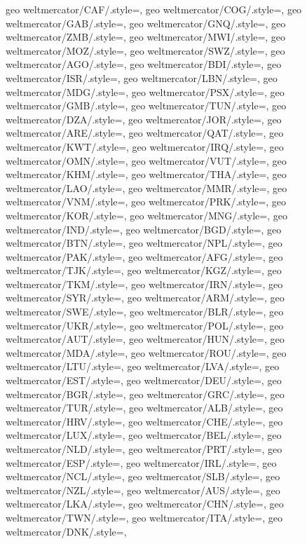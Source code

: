 {  geo weltmercator/CAF/.style={},
  geo weltmercator/COG/.style={},
  geo weltmercator/GAB/.style={},
  geo weltmercator/GNQ/.style={},
  geo weltmercator/ZMB/.style={},
  geo weltmercator/MWI/.style={},
  geo weltmercator/MOZ/.style={},
  geo weltmercator/SWZ/.style={},
  geo weltmercator/AGO/.style={},
  geo weltmercator/BDI/.style={},
  geo weltmercator/ISR/.style={},
  geo weltmercator/LBN/.style={},
  geo weltmercator/MDG/.style={},
  geo weltmercator/PSX/.style={},
  geo weltmercator/GMB/.style={},
  geo weltmercator/TUN/.style={},
  geo weltmercator/DZA/.style={},
  geo weltmercator/JOR/.style={},
  geo weltmercator/ARE/.style={},
  geo weltmercator/QAT/.style={},
  geo weltmercator/KWT/.style={},
  geo weltmercator/IRQ/.style={},
  geo weltmercator/OMN/.style={},
  geo weltmercator/VUT/.style={},
  geo weltmercator/KHM/.style={},
  geo weltmercator/THA/.style={},
  geo weltmercator/LAO/.style={},
  geo weltmercator/MMR/.style={},
  geo weltmercator/VNM/.style={},
  geo weltmercator/PRK/.style={},
  geo weltmercator/KOR/.style={},
  geo weltmercator/MNG/.style={},
  geo weltmercator/IND/.style={},
  geo weltmercator/BGD/.style={},
  geo weltmercator/BTN/.style={},
  geo weltmercator/NPL/.style={},
  geo weltmercator/PAK/.style={},
  geo weltmercator/AFG/.style={},
  geo weltmercator/TJK/.style={},
  geo weltmercator/KGZ/.style={},
  geo weltmercator/TKM/.style={},
  geo weltmercator/IRN/.style={},
  geo weltmercator/SYR/.style={},
  geo weltmercator/ARM/.style={},
  geo weltmercator/SWE/.style={},
  geo weltmercator/BLR/.style={},
  geo weltmercator/UKR/.style={},
  geo weltmercator/POL/.style={},
  geo weltmercator/AUT/.style={},
  geo weltmercator/HUN/.style={},
  geo weltmercator/MDA/.style={},
  geo weltmercator/ROU/.style={},
  geo weltmercator/LTU/.style={},
  geo weltmercator/LVA/.style={},
  geo weltmercator/EST/.style={},
  geo weltmercator/DEU/.style={},
  geo weltmercator/BGR/.style={},
  geo weltmercator/GRC/.style={},
  geo weltmercator/TUR/.style={},
  geo weltmercator/ALB/.style={},
  geo weltmercator/HRV/.style={},
  geo weltmercator/CHE/.style={},
  geo weltmercator/LUX/.style={},
  geo weltmercator/BEL/.style={},
  geo weltmercator/NLD/.style={},
  geo weltmercator/PRT/.style={},
  geo weltmercator/ESP/.style={},
  geo weltmercator/IRL/.style={},
  geo weltmercator/NCL/.style={},
  geo weltmercator/SLB/.style={},
  geo weltmercator/NZL/.style={},
  geo weltmercator/AUS/.style={},
  geo weltmercator/LKA/.style={},
  geo weltmercator/CHN/.style={},
  geo weltmercator/TWN/.style={},
  geo weltmercator/ITA/.style={},
  geo weltmercator/DNK/.style={},
}
